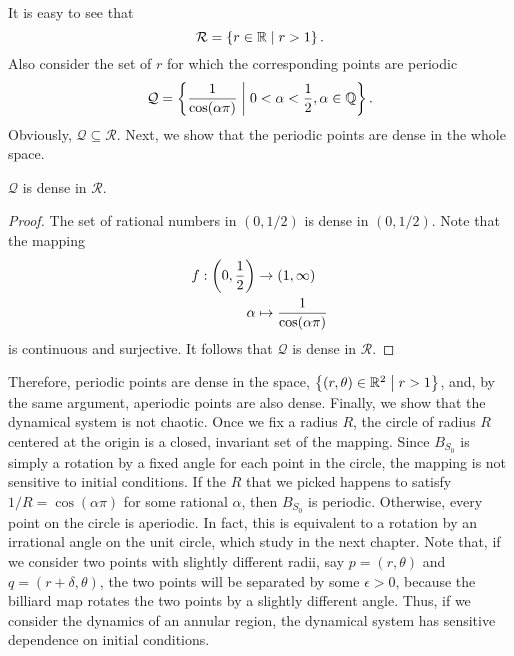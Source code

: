 \documentclass[10pt,twoside]{book}
\begin{document}
It is easy to see that
\begin{equation*}
  \mathcal{R} = \left \{ r \in \mathbb{R} \mathrel{} \middle| \mathrel{} r > 1 \right \}.
\end{equation*}
Also consider the set of $r$ for which the corresponding points are periodic
\begin{equation*}
  \mathcal{Q} = \left \{ \frac{1}{\cos(\alpha\pi)} \mathrel{} \middle| \mathrel{} 0 < \alpha < \frac{1}{2}, \alpha \in \mathbb{Q} \right \}.
\end{equation*}
Obviously, $\mathcal{Q} \subseteq \mathcal{R}$.
Next, we show that the periodic points are dense in the whole space.
\begin{proposition}
  $\mathcal{Q}$ is dense in $\mathcal{R}$.
  \begin{proof}
  The set of rational numbers in $(0,1/2)$ is dense in $(0,1/2)$.
  Note that the mapping
    \begin{align*}
      f: \left ( 0,\frac{1}{2} \right ) &\to (1, \infty)  \\
      \alpha &\mapsto \frac{1}{\cos(\alpha\pi)}
    \end{align*}
  is continuous and surjective.
  It follows that $\mathcal{Q}$ is dense in $\mathcal{R}$.
  \end{proof}
\end{proposition}
Therefore, periodic points are dense in the space, $\left \{ (r, \theta) \in \mathbb{R}^2 \mathrel{} \middle| \mathrel{} r > 1 \right \}$, and, by the same argument, aperiodic points are also dense.
Finally, we show that the dynamical system is not chaotic.
Once we fix a radius $R$, the circle of radius $R$ centered at the origin is a closed, invariant set of the mapping.
Since $B_{S_0}$ is simply a rotation by a fixed angle for each point in the circle, the mapping is not sensitive to initial conditions.
If the $R$ that we picked happens to satisfy $1/R = \cos(\alpha\pi)$ for some rational $\alpha$, then $B_{S_0}$ is periodic.
Otherwise, every point on the circle is aperiodic.
In fact, this is equivalent to a rotation by an irrational angle on the unit circle, which study in the next chapter.
Note that, if we consider two points with slightly different radii, say $p = (r, \theta)$ and $q = (r + \delta, \theta)$, the two points will be separated by some $\epsilon > 0$, because the billiard map rotates the two points by a slightly different angle.
Thus, if we consider the dynamics of an annular region, the dynamical system has sensitive dependence on initial conditions.
\end{document}

